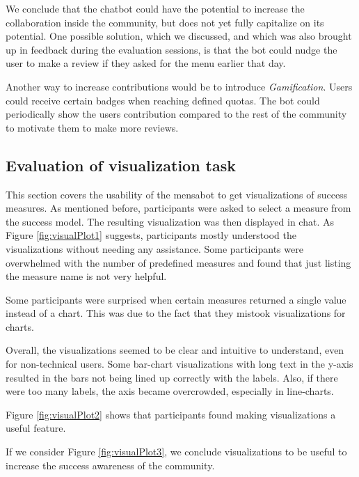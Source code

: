 

We conclude that the chatbot could have the potential to increase the collaboration inside the community, but does not yet fully capitalize on its potential. One possible solution, which we discussed, and which was also brought up in feedback during the evaluation sessions, is that the bot could nudge the user to make a review if they asked for the menu earlier that day.

Another way to increase contributions would be to introduce \emph{Gamification}. Users could receive certain badges when reaching defined quotas. The bot could periodically show the users contribution compared to the rest of the community to motivate them to make more reviews.

\subsection{Evaluation of visualization task}

This section covers the usability of the mensabot to get visualizations of success measures. As mentioned before, participants were asked to select a measure from the success model. The resulting visualization was then displayed in chat. As Figure \ref{fig:visualPlot1} suggests, participants mostly understood the visualizations without needing any assistance. Some participants were overwhelmed with the number of predefined measures and found that just listing the measure name is not very helpful. 

Some participants were surprised when certain measures returned a single value instead of a chart. This was due to the fact that they mistook visualizations for charts. 



Overall, the visualizations seemed to be clear and intuitive to understand, even for non-technical users. Some bar-chart visualizations with long text in the y-axis resulted in the bars not being  lined up correctly with the labels. Also, if there were too many labels, the axis became overcrowded, especially in line-charts.



Figure \ref{fig:visualPlot2} shows that participants found making visualizations a useful feature. 



If we consider Figure \ref{fig:visualPlot3}, we conclude visualizations to be useful to increase the success awareness of the community.

